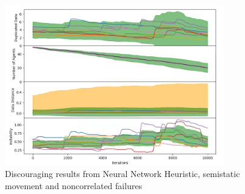 \documentclass{UoYCSproject}
\begin{document}
\begin{figure}[htb]
\label{fig:Failed_GA}
\begin{center}
\centering
\includegraphics[height=7cm]{"./Failed_GA.png"}
\caption{Discouraging results from Neural Network Heuristic, semi\-static movement and non\-correlated failures}
\end{center}
\end{figure}

\end{document}

